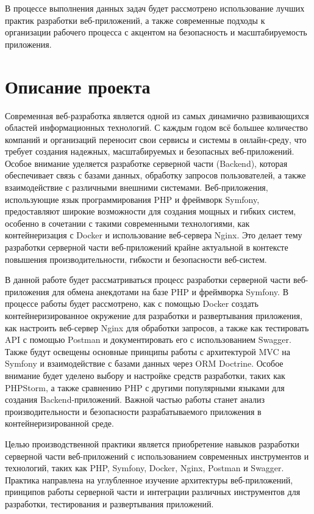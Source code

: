 \documentclass[pract]{SCWorks}
\begin{document}
В процессе выполнения данных задач будет рассмотрено использование
лучших практик разработки веб-приложений, а также современные подходы
к организации рабочего процесса с акцентом на безопасность и масштабируемость
приложения.

\section{Описание проекта}

Современная веб-разработка является одной из самых динамично развивающихся 
областей информационных технологий. С каждым годом всё большее количество
компаний и организаций переносит свои сервисы и системы в онлайн-среду,
что требует создания надежных, масштабируемых и безопасных веб-приложений.
Особое внимание уделяется разработке серверной части (Backend), 
которая обеспечивает связь с базами данных, обработку запросов 
пользователей, а также взаимодействие с различными внешними системами. 
Веб-приложения, использующие язык программирования PHP и фреймворк 
Symfony, предоставляют широкие возможности для создания мощных и гибких
систем, особенно в сочетании с такими современными технологиями, как 
контейнеризация с Docker и использование веб-сервера Nginx. Это делает 
тему разработки серверной части веб-приложений крайне актуальной в 
контексте повышения производительности, гибкости и безопасности
веб-систем.

В данной работе будет рассматриваться процесс разработки серверной
части веб-приложения для обмена анекдотами на базе PHP и фреймворка 
Symfony. В процессе работы будет рассмотрено, как с помощью Docker
создать контейнеризированное окружение для разработки и развертывания
приложения, как настроить веб-сервер Nginx для обработки запросов, а также
как тестировать API с помощью Postman и документировать его с использованием
Swagger. Также будут освещены основные принципы работы с архитектурой 
MVC на Symfony и взаимодействие с базами данных через ORM Doctrine. 
Особое внимание будет уделено выбору и настройке средств разработки, 
таких как PHPStorm, а также сравнению PHP с другими популярными языками 
для создания Backend-приложений. Важной частью работы станет анализ 
производительности и безопасности разрабатываемого приложения в
контейнеризированной среде.

Целью производственной практики является приобретение навыков разработки 
серверной части веб-приложений с использованием современных инструментов 
и технологий, таких как PHP, Symfony, Docker, Nginx, Postman и Swagger. 
Практика направлена на углубленное изучение архитектуры веб-приложений, 
принципов работы серверной части и интеграции различных инструментов 
для разработки, тестирования и развертывания приложений.
\end{document}
